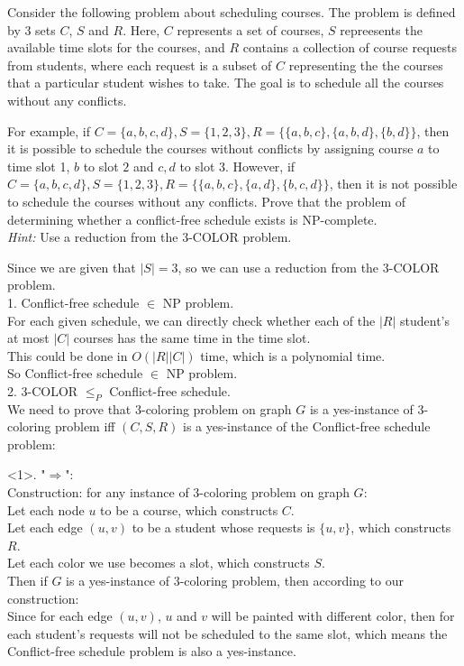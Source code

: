 \problem{}
Consider the following problem about scheduling courses.  The problem is defined by 3 sets $C$, $S$ and $R$.  Here, $C$ represents a set of  courses, $S$ repreesents the available time slots for the courses, and $R$ contains a collection of course requests from students, where each request is a subset of $C$ representing the the courses that a particular student wishes to take.  The goal is to schedule all the courses without any conflicts.  

For example, if $C = \{a, b, c, d\}, S = \{1, 2, 3\}, R = \{\{a, b, c\}, \{a, b, d\}, \{b, d\}\}$, then it is possible to schedule the courses without conflicts by assigning course $a$ to time slot 1, $b$ to slot $2$ and $c, d$ to slot 3.  However, if $C = \{a, b, c, d\}, S = \{1, 2, 3\}, R = \{\{a, b, c\}, \{a, d\}, \{b, c, d\}\}$, then it is not possible to schedule the courses without any conflicts.  Prove that the problem of determining whether a conflict-free schedule exists is NP-complete. \\

\noindent  \emph{Hint:}  Use a reduction from the 3-COLOR problem.

\solution{}
Since we are given that $|S|=3$, so we can use a reduction from the $3$-COLOR problem.\\

1. Conflict-free schedule $\in$ NP problem.\\
For each given schedule, we can directly check whether each of the $|R|$ student's at most $|C|$ courses has the same time in the time slot.\\
This could be done in $O(|R||C|)$ time, which is a polynomial time.\\
So Conflict-free schedule $\in$ NP problem.\\

2. $3$-COLOR $\leq_P$ Conflict-free schedule.\\
We need to prove that $3$-coloring problem on graph $G$ is a yes-instance of $3$-coloring problem iff $(C, S, R)$ is a yes-instance of the Conflict-free schedule problem:

<1>. "$\Rightarrow$":\\
Construction: for any instance of $3$-coloring problem on graph $G$:\\
Let each node $u$ to be a course, which constructs $C$.\\ 
Let each edge $(u, v)$ to be a student whose requests is $\{u, v\}$, which constructs $R$.\\
Let each color we use becomes a slot, which constructs $S$.\\
Then if $G$ is a yes-instance of 3-coloring problem, then according to our construction:\\
Since for each edge $(u, v)$, $u$ and $v$ will be painted with different color, then for each student's requests will not be scheduled to the same slot, which means the Conflict-free schedule problem is also a yes-instance.\\

